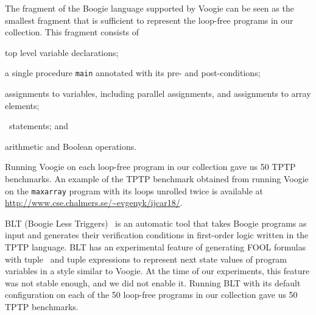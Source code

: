 The fragment of the Boogie language supported by Voogie can be seen as the smallest fragment that is sufficient to represent the loop-free programs in our collection. This fragment consists of
\begin{enumerate*}[label=(\roman*)]
  \item top level variable declarations;
  \item a single procedure \verb'main' annotated with its pre- and post-conditions;
  \item assignments to variables, including parallel assignments, and assignments to array elements;
  \item \ITE\ statements; and
  \item arithmetic and Boolean operations.
\end{enumerate*}
Running Voogie on each loop-free program in our collection gave us 50 TPTP benchmarks.
An example of the TPTP benchmark obtained from running Voogie on the \texttt{maxarray} program with its loops unrolled twice is available at \url{http://www.cse.chalmers.se/~evgenyk/ijcar18/}.

BLT (Boogie Less Triggers)~\cite{CF-iFM17} is an automatic tool that takes Boogie programs as input and generates their verification conditions in first-order logic written in the TPTP language. BLT has an experimental feature of generating FOOL formulas with tuple \LETIN\ and tuple expressions to represent next state values of program variables in a style similar to Voogie. At the time of our experiments, this feature was not stable enough, and we did not enable it. Running BLT with its default configuration on each of the 50 loop-free programs in our collection gave us 50 TPTP benchmarks.

